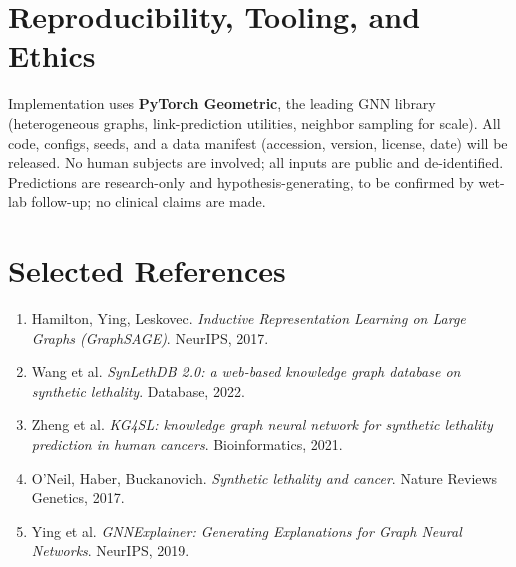 \documentclass[11pt]{article}
\begin{document}
\section{Reproducibility, Tooling, and Ethics}

Implementation uses \textbf{PyTorch Geometric}, the leading GNN library
(heterogeneous graphs, link-prediction utilities, neighbor sampling for scale).
All code, configs, seeds, and a data manifest (accession, version, license,
date) will be released. No human subjects are involved; all inputs are public
and de-identified. Predictions are research-only and hypothesis-generating, to
be confirmed by wet-lab follow-up; no clinical claims are made.

\section*{Selected References}
\small
\begin{enumerate}[leftmargin=1.4em,itemsep=0pt]
\item Hamilton, Ying, Leskovec. \textit{Inductive Representation Learning on
Large Graphs (GraphSAGE)}. NeurIPS, 2017.
\item Wang et al. \textit{SynLethDB 2.0: a web-based knowledge graph database on
synthetic lethality}. Database, 2022.
\item Zheng et al. \textit{KG4SL: knowledge graph neural network for synthetic
lethality prediction in human cancers}. Bioinformatics, 2021.
\item O'Neil, Haber, Buckanovich. \textit{Synthetic lethality and cancer}.
Nature Reviews Genetics, 2017.
\item Ying et al. \textit{GNNExplainer: Generating Explanations for Graph Neural
Networks}. NeurIPS, 2019.
\end{enumerate}
\end{document}

